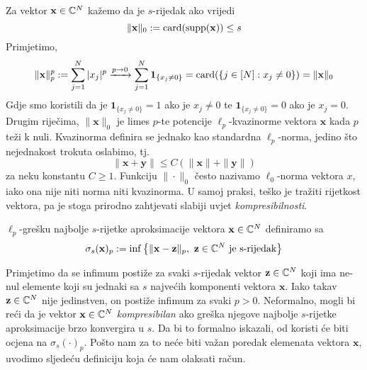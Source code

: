 \documentclass[a4paper,twoside,12pt]{memoir} %
\newcommand{\vect}[1]{\mathbf{#1}}
\renewcommand{\vec}{\vect}
\newcommand{\card}{\text{\normalfont{card}}}
\newcommand{\supp}{\text{\normalfont{supp}}}
\begin{document}
\noindent Za vektor $\vec{x}\in\C^{N}$ ka\v{z}emo da je $s$-rijedak ako vrijedi $$\|\vec{x}\|_0 := \card(\supp(\vec{x})) \leq s$$
Primjetimo,
$$\|\vec{x}\|_p^p := \sum_{j=1}^N|x_j|^p \xrightarrow{p\rightarrow 0} \sum_{j=1}^N\mathbf{1}_{\{x_j \neq 0\}} = \card(\{j \in [N]:x_j \neq 0\}) = \|\vec{x}\|_0$$
Gdje smo koristili da je $\mathbf{1}_{\{x_j \neq 0\}} = 1$  ako je $x_j \neq 0$ te $\mathbf{1}_{\{x_j \neq 0\}} = 0$  ako je $x_j = 0$. Drugim rije\v{c}ima, $\|\vec{x}\|_0$ je limes $p$-te potencije $\ell_p$-kvazinorme vektora $\vec{x}$ kada $p$ te\v{z}i k nuli. Kvazinorma definira se jednako kao standardna $\ell_p$-norma, jedino \v{s}to nejednakost trokuta oslabimo, tj. 
$$\|\vec{x}+\vec{y}\|\leq C(\|\vec{x}\|+\|\vec{y}\|)$$ 
za neku konstantu $C \geq 1$.
Funkciju $\|\cdot\|_0$ \v{c}esto nazivamo $\ell_0$-norma vektora $x$, iako  ona nije niti norma niti kvazinorma. U samoj praksi, te\v{s}ko je tra\v{z}iti rijetkost vektora, pa je stoga prirodno zahtjevati slabiji uvjet \textit{kompresibilnosti}.  
\begin{defn}
    $\ell_p$-gre\v{s}ku najbolje $s$-rijetke aproksimacije vektora $\vec{x}\in\C^{N}$ definiramo sa 
    $$\sigma_s(\vec{x})_p := \inf\big\{\|\vec{x}-\vec{z}\|_p,\ \vec{z} \in \C^{N} \ \text{je s-rijedak}\big\}$$
\end{defn}
\indent Primjetimo da se infimum posti\v{z}e za svaki $s$-rijedak vektor $\vec{z} \in \C^{N}$ koji ima ne-nul elemente koji su jednaki sa $s$ najve\'cih komponenti vektora $\vec{x}$. Iako takav $\vec{z} \in \C^{N}$ nije jedinstven, on posti\v{z}e infimum za svaki $p > 0$. Neformalno, mogli bi re\'ci da je vektor $\vec{x} \in \C^{N}$ \textit{kompresibilan} ako gre\v{s}ka njegove najbolje $s$-rijetke aproksimacije brzo konvergira u $s$. Da bi to formalno iskazali, od koristi \'ce biti ocjena na $\sigma_s(\cdot)_p$. Po\v{s}to nam za to ne\'ce biti va\v{z}an poredak elemenata vektora $\vec{x}$, uvodimo sljede\'cu definiciju koja \'ce nam olaksati ra\v{c}un.
\end{document}
